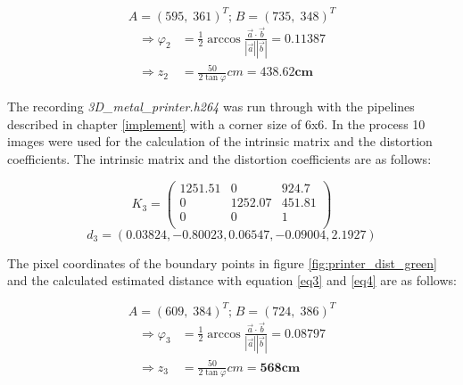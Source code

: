 \vspace{1mm}
\begin{equation*}
    A = (595,\;361)^{T}\text{;}\; B = (735,\;348)^{T}
\end{equation*}
\vspace{-10mm}
\begin{align*}
    \Rightarrow \varphi_2 &= \frac{1}{2}\arccos{\frac{\vec{a} \cdot \vec{b}}{|\vec{a}||\vec{b}|}} = \bm{0.11387}\\
    \Rightarrow  z_2 &= \frac{50}{2\tan\varphi}cm = \bm{438.62cm}
\end{align*}

\vspace{\baselineskip}
The recording \textit{3D\_metal\_printer.h264} was run through with the pipelines described in chapter \ref{implement} with a corner size of 6x6. In the process 10 images were used for the calculation of the intrinsic matrix and the distortion coefficients. The intrinsic matrix and the distortion coefficients are as follows:

\vspace{1mm}
\begin{equation*}
    K_3 = 
    \begin{pmatrix}
        1251.51 & 0 & 924.7\\
        0 & 1252.07 & 451.81\\
        0 & 0 & 1\\
    \end{pmatrix}
\end{equation*}
\vspace{1mm}
\begin{equation*}
    d_3 = (0.03824, -0.80023,  0.06547, -0.09004,  2.1927)
\end{equation*}

The pixel coordinates of the boundary points in figure \ref{fig:printer_dist_green} and the calculated estimated distance with equation \ref{eq3} and \ref{eq4} are as follows:

\vspace{1mm}
\begin{equation*}
    A = (609,\;384)^{T}\text{;}\; B = (724,\;386)^{T}
\end{equation*}
\vspace{-10mm}
\begin{align*}
    \Rightarrow \varphi_3 &= \frac{1}{2}\arccos{\frac{\vec{a} \cdot \vec{b}}{|\vec{a}||\vec{b}|}} = \bm{0.08797}\\
    \Rightarrow  z_3 &= \frac{50}{2\tan\varphi}cm = \bm{568cm}
\end{align*}

